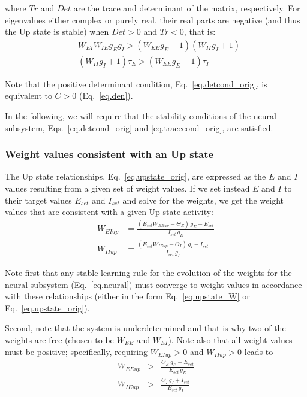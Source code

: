 \documentclass[twocolumn]{article}
\newcommand{\EE}{\mathit{EE}}
\newcommand{\EI}{\mathit{EI}}
\newcommand{\IE}{\mathit{IE}}
\newcommand{\II}{\mathit{II}}
\newcommand{\set}{\mathit{set}}
\newcommand{\up}{\mathit{up}}
\newcommand{\De}{\mathit{Det}}
\newcommand{\Tr}{\mathit{Tr}}
\begin{document}
\noindent where $\Tr$ and $\De$ are the trace and determinant of the matrix, respectively. For eigenvalues either complex or purely real, their real parts are negative (and thus the Up state is stable) when $\De>0$ and $\Tr<0$, that is:
\begin{eqnarray}
& W_{\EI} W_{\IE} g_E g_I > (W_{\EE} g_E - 1)(W_{\II} g_I + 1) \label{eq.detcond_orig}\\
& (W_{\II} g_I + 1)\tau_E > (W_{\EE} g_E - 1)\tau_I
\label{eq.tracecond_orig}
\end{eqnarray}

\noindent Note that the positive determinant condition, Eq.\ \ref{eq.detcond_orig}, is equivalent to $C>0$ (Eq.\ \ref{eq.den}).

In the following, we will require that the stability conditions of the neural subsystem, Eqs.\ \ref{eq.detcond_orig} and \ref{eq.tracecond_orig}, are satisfied.



\subsubsection{Weight values consistent with an Up state}

The Up state relationships, Eq.\ \ref{eq.upstate_orig}, are expressed as the $E$ and $I$ values resulting from a given set of weight values. If we set instead $E$ and $I$ to their target values $E_{\set}$ and $I_{\set}$ and solve for the weights, we get the weight values that are consistent with a given Up state activity:
\begin{equation}
\begin{aligned}
W_{\EI\up} & = \frac{(E_{\set} W_{\EE\up} - \Theta_E) \, g_E - E_{\set}}{I_{\set} \, g_E} \\
W_{\II\up} & = \frac{(E_{\set} W_{\IE\up} - \Theta_I) \, g_I - I_{\set}}{I_{\set} \, g_I}
\end{aligned}
\label{eq.upstate_W}
\end{equation}

\noindent Note first that any stable learning rule for the evolution of the weights for the neural subsystem (Eq.\ \ref{eq.neural}) must converge to weight values in accordance with these relationships (either in the form Eq.\ \ref{eq.upstate_W} or Eq.\ \ref{eq.upstate_orig}).

Second, note that the system is underdetermined and that is why two of the weights are free (chosen to be $W_{\EE}$ and $W_{\EI}$). Note also that all weight values must be positive; specifically, requiring $W_{\EI\up}>0$ and $W_{\II\up}>0$ leads to
\begin{eqnarray}
W_{\EE\up} & > & \frac{\Theta_E \, g_E + E_{\set}}{E_{\set} \, g_E}
\label{eq.positive_WEI} \\
W_{\IE\up} & > & \frac{\Theta_I \, g_I + I_{\set}}{E_{\set} \, g_I}
\label{eq.positive_WII}
\end{eqnarray}
\end{document}
